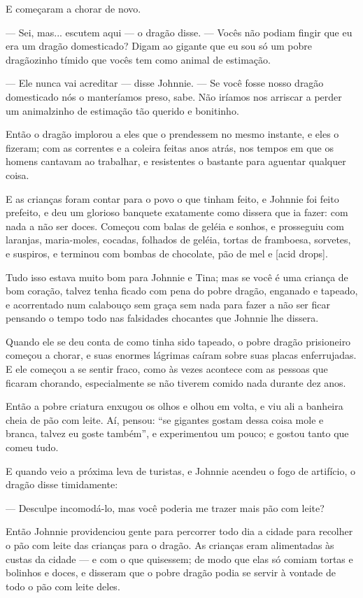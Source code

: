 E começaram a chorar de novo.

— Sei, mas... escutem aqui — o dragão disse. — Vocês não podiam fingir
que eu era um dragão domesticado? Digam ao gigante que eu sou só um
pobre dragãozinho tímido que vocês tem como animal de estimação.

— Ele nunca vai acreditar — disse Johnnie. — Se você fosse nosso
dragão domesticado nós o manteríamos preso, sabe. Não iríamos nos
arriscar a perder um animalzinho de estimação tão querido e
bonitinho.

Então o dragão implorou a eles que o prendessem no mesmo instante, e
eles o fizeram; com as correntes e a coleira feitas anos atrás, nos
tempos em que os homens cantavam ao trabalhar, e resistentes o
bastante para aguentar qualquer coisa.

E as crianças foram contar para o povo o que tinham feito, e Johnnie
foi feito prefeito, e deu um glorioso banquete exatamente como
dissera que ia fazer: com nada a não ser doces. Começou com balas de
geléia e sonhos, e prosseguiu com laranjas, maria-moles, cocadas,
folhados de geléia, tortas de framboesa, sorvetes, e suspiros, e
terminou com bombas de chocolate, pão de mel e [acid drops].

Tudo isso estava muito bom para Johnnie e Tina; mas se você é uma
criança de bom coração, talvez tenha ficado com pena do pobre dragão,
enganado e tapeado, e acorrentado num calabouço sem graça sem nada
para fazer a não ser ficar pensando o tempo todo nas falsidades
chocantes que Johnnie lhe dissera.

Quando ele se deu conta de como tinha sido tapeado, o pobre dragão
prisioneiro começou a chorar, e suas enormes lágrimas caíram sobre
suas placas enferrujadas. E ele começou a se sentir fraco, como às
vezes acontece com as pessoas que ficaram chorando, especialmente se
não tiverem comido nada durante dez anos.

Então a pobre criatura enxugou os olhos e olhou em volta, e viu ali a
banheira cheia de pão com leite. Aí, pensou: “se gigantes gostam
dessa coisa mole e branca, talvez eu goste também”, e experimentou um
pouco; e gostou tanto que comeu tudo.

E quando veio a próxima leva de turistas, e Johnnie acendeu o fogo de
artifício, o dragão disse timidamente:

— Desculpe incomodá-lo, mas você poderia me trazer mais pão com leite?

Então Johnnie providenciou gente para percorrer todo dia a cidade para
recolher o pão com leite das crianças para o dragão. As crianças eram
alimentadas às custas da cidade — e com o que quisessem; de modo que
elas só comiam tortas e bolinhos e doces, e disseram que o pobre
dragão podia se servir à vontade de todo o pão com leite deles.

